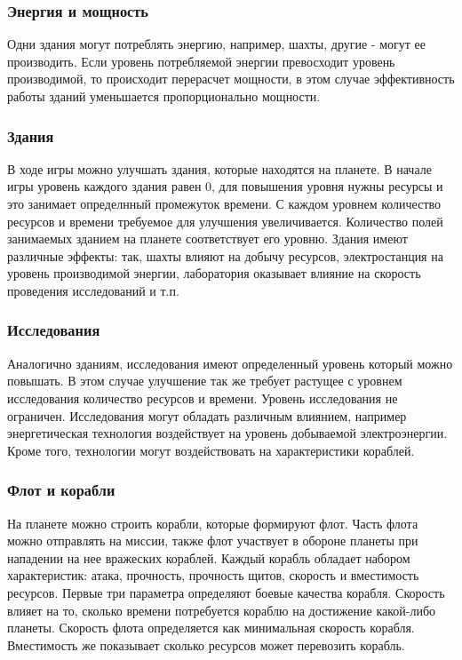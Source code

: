 \subsubsection{Энергия и мощность}
Одни здания могут потреблять энергию, например, шахты, другие - могут ее производить. Если уровень потребляемой энергии превосходит уровень производимой, то происходит перерасчет мощности, в этом случае эффективность работы зданий уменьшается пропорционально мощности.  

\subsubsection{Здания}
В ходе игры можно улучшать здания, которые находятся на планете. В начале игры уровень каждого здания равен 0, для повышения уровня нужны ресурсы и это занимает определнный промежуток времени. С каждом уровнем количество ресурсов и времени требуемое для улучшения увеличивается. Количество полей занимаемых зданием на планете соответствует его уровню. Здания имеют различные эффекты: так, шахты влияют на добычу ресурсов, электростанция на уровень производимой энергии, лаборатория оказывает влияние на скорость проведения исследований и т.п.

\subsubsection{Исследования}
Аналогично зданиям, исследования имеют определенный уровень который можно повышать. В этом случае улучшение так же требует растущее с уровнем исследования количество ресурсов и времени. Уровень исследования не ограничен. Исследования могут обладать различным влиянием, например энергетическая технология воздействует на уровень добываемой электроэнергии. Кроме того, технологии могут воздействовать на характеристики кораблей. 

\subsubsection{Флот и корабли}
На планете можно строить корабли, которые формируют флот. Часть флота можно отправлять на миссии, также флот участвует в обороне планеты при нападении на нее вражеских кораблей. Каждый корабль обладает набором характеристик: атака, прочность, прочность щитов, скорость и вместимость ресурсов. Первые три параметра определяют боевые качества корабля. Скорость влияет на то, сколько времени потребуется кораблю на достижение какой-либо планеты. Скорость флота определяется как минимальная скорость корабля. Вместимость же показывает сколько ресурсов может перевозить корабль.


